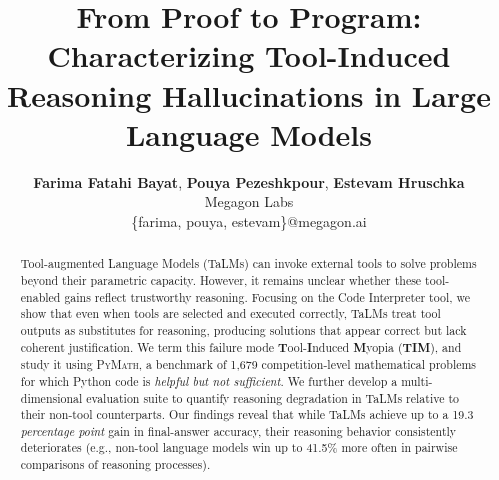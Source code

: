 \documentclass[11pt]{article}
\title{From Proof to Program: Characterizing Tool-Induced Reasoning Hallucinations in Large Language Models}
\author{
 \textbf{Farima Fatahi Bayat},
 \textbf{Pouya Pezeshkpour},
 \textbf{Estevam Hruschka}
\\
 Megagon Labs
\\
    \{farima, pouya, estevam\}@megagon.ai
\\
}
\def \dataset{\textsc{PyMath}\xspace}
\def \task{\textsc{TIM}\xspace}
\newcommand{\pouya}[1]{{\color{violet}Pouya: #1}}
\newcommand{\estevam}[1]{{\color{blue}Estevam: #1}}
\begin{document}
\maketitle
\begin{abstract}

Tool-augmented Language Models (TaLMs) can invoke external tools %
to solve %
problems beyond their parametric capacity. However, it remains unclear whether these tool-enabled gains reflect trustworthy reasoning.
Focusing on the Code Interpreter tool,
we show that even when tools are selected and executed correctly, TaLMs treat tool outputs as substitutes for reasoning, producing solutions that appear correct but lack coherent justification. We term this failure mode \textbf{T}ool-\textbf{I}nduced \textbf{M}yopia (\textbf{\task{}}), and study it using
\dataset, 
a benchmark of 1,679 competition-level mathematical problems for which
Python code is \textit{helpful but not sufficient}. We further develop a multi-dimensional evaluation suite to quantify reasoning degradation in TaLMs relative to their non-tool counterparts. Our findings reveal that while TaLMs achieve up to a 19.3 \textit{percentage point} gain in final-answer accuracy, their reasoning behavior consistently deteriorates (e.g., non-tool language models win up to 41.5\% more often in pairwise comparisons of reasoning processes). 

\end{abstract}
\end{document}
